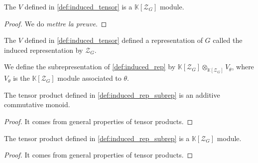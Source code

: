\begin{proposition}
    \label{prop:tensor_module_sub}
    \leanok 
    The $V$ defined in \ref{def:induced_tensor} is a $\mathbb{K}[\mathcal{Z}_G]$ module.
\end{proposition}
\begin{proof}
    \leanok
    We do \textit{mettre la preuve}.
\end{proof}

\begin{definition}
    \label{def:induced_rep}
    \leanok
    The $V$ defined in \ref{def:induced_tensor} defined a representation of $G$ called the
    induced representation by $\mathcal{Z}_G$.
\end{definition}

\begin{definition}
    \label{def:induced_rep_subrep}
    \leanok
    We define the subrepresentation of \ref{def:induced_rep} by 
    $\mathbb{K}[\mathcal{Z}_G]\otimes_{\mathbb{K}[\mathcal{Z}_G]}V_\theta$,
    where $V_\theta$ is the $\mathbb{K}[\mathcal{Z}_G]$ module associated to $\theta$.
\end{definition}

\begin{proposition}
    \label{prop:subrep_addmon}
    \leanok 
   The tensor product defined in \ref{def:induced_rep_subrep} is an additive commutative monoid.
\end{proposition}
\begin{proof}
    \leanok
    It comes from general properties of tensor products.
\end{proof}

\begin{proposition}
    \label{prop:subrep_module}
    \leanok 
   The tensor product defined in \ref{def:induced_rep_subrep} is a $\mathbb{K}[\mathcal{Z}_G]$ module.
\end{proposition}
\begin{proof}
    \leanok
    It comes from general properties of tensor products.
\end{proof}


